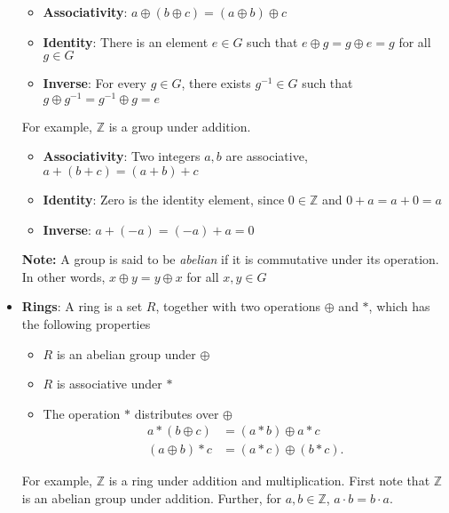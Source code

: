 \documentclass{report}
\begin{document}
\begin{itemize}
\begin{itemize}
                \item \textbf{Associativity}: $a \oplus (b\oplus c) = (a\oplus b) \oplus c$
                \item \textbf{Identity}: There is an element $e\in G$ such that $e \oplus g = g \oplus e = g$ for all $g \in G $
                \item \textbf{Inverse}: For every $g\in G$, there exists $g^{-1} \in G$ such that $g \oplus g^{-1} = g^{-1}\oplus g = e $
            \end{itemize}
            For example, $\mathbb{Z}$ is a group under addition.
            \begin{itemize}
                \item \textbf{Associativity}: Two integers $a,b$ are associative, $a + (b + c)  = (a+b) +c $
                \item \textbf{Identity}: Zero is the identity element, since $0 \in \mathbb{Z}$ and $0 + a = a+ 0 = a $
                \item \textbf{Inverse}: $a + (-a) = (-a) + a = 0$
            \end{itemize}
            \textbf{Note:} A group is said to be \textit{abelian} if it is commutative under its operation. In other words, $x \oplus y = y\oplus x$ for all $x,y \in G $
        \item \textbf{Rings}: A ring is a set $R$, together with two operations $\oplus $ and $* $, which has the following properties
            \begin{itemize}
                \item $R$ is an abelian group under $\oplus $
                \item $R$ is associative under $*$
                \item The operation $*$ distributes over $\oplus$
                    \begin{align*}
                        a * (b\oplus c) &= (a*b) \oplus a * c \\
                        (a\oplus b) * c &= (a*c) \oplus (b*c)
                    .\end{align*}
            \end{itemize}
            For example, $\mathbb{Z}$ is a ring under addition and multiplication. First note that $\mathbb{Z}$ is an abelian group under addition. Further, for $a,b\in \mathbb{Z}$, $a\cdot b = b\cdot a$. 

\end{itemize}
\end{document}

